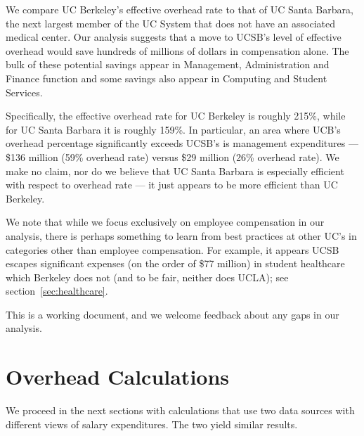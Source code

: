 \documentclass[11pt]{article}
\begin{document}
We compare UC Berkeley's effective overhead rate to that of UC Santa
Barbara, the next largest member of the UC System that does not have
an associated medical center.  Our analysis suggests that a move to
UCSB's level of effective overhead would save hundreds of millions of
dollars in compensation alone.  The bulk of these potential savings
appear in Management, Administration and Finance function and some
savings also appear in Computing and Student Services.

Specifically, the effective overhead rate for UC Berkeley is roughly
215\%, while for UC Santa Barbara it is roughly 159\%.  In particular,
an area where UCB's overhead percentage significantly exceeds UCSB's
is management expenditures --- \$136 million (59\% overhead rate)
versus \$29 million (26\% overhead rate).  We make no claim, nor do we
believe that UC Santa Barbara is especially efficient with respect to
overhead rate --- it just appears to be more efficient than UC
Berkeley.



We note that while we focus exclusively on employee compensation in our analysis, 
there is perhaps something to learn from best practices
at other UC's in categories other than employee compensation. For example, it appears UCSB 
escapes significant expenses (on the order of \$77 million) in student
healthcare which Berkeley does not (and to be fair, neither does
UCLA); see section~\ref{sec:healthcare}. 


This is a working document, and we welcome feedback about any gaps in our
analysis.


\section{Overhead Calculations}

We proceed in the next sections with calculations that use
two data sources with different views of salary expenditures.
The two yield similar results.  
\end{document}

